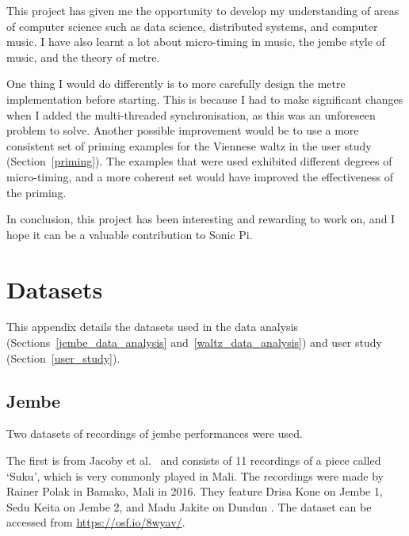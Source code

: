 \documentclass[12pt,twoside,openright]{report}
\begin{document}
This project has given me the opportunity to develop my understanding of areas
of computer science such as data science, distributed systems, and computer music. I have also learnt a lot about micro-timing in music, the jembe
style of music, and the theory of metre.

One thing I would do differently is to more carefully design the metre
implementation before starting. This is because I had to make significant
changes when I added the multi-threaded synchronisation, as this was an
unforeseen problem to solve. Another possible improvement would be to
use a more consistent set of priming examples for the Viennese waltz in the user
study (Section~\ref{priming}). The examples that were used exhibited different degrees of
micro-timing, and a more coherent set would have improved the effectiveness of
the priming.

In conclusion, this project has been interesting and rewarding to work on, and I hope it can be a valuable contribution to Sonic Pi.





\printbibliography[heading=bibintoc]





\appendix





\chapter{Datasets} \label{appendix_datasets}

This appendix details the datasets used in the data analysis (Sections~\ref{jembe_data_analysis} and~\ref{waltz_data_analysis}) and user study (Section~\ref{user_study}).



\section*{Jembe} \label{appendix_datasets_jembe}

Two datasets of recordings of jembe performances were used.

The first is from Jacoby et al.\ \cite{jacoby2021} and consists of 11 recordings of a piece called `Suku', which is very commonly played in Mali. The recordings were made by Rainer Polak in Bamako, Mali in 2016. They feature Drisa Kone on Jembe 1, Sedu Keita on Jembe 2, and Madu Jakite on Dundun \cite{jacoby2021supp}. The dataset can be accessed from \url{https://osf.io/8wyav/}.
\end{document}
